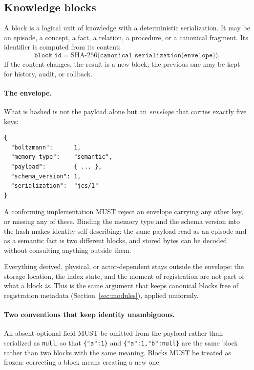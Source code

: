 \documentclass[11pt,a4paper]{article}
\begin{document}
\subsection{Knowledge blocks}
\label{sec:blocks}

A block is a logical unit of knowledge with a deterministic serialization. It
may be an episode, a concept, a fact, a relation, a procedure, or a canonical
fragment. Its identifier is computed from its content:
\begin{equation}
  \texttt{block\_id} = \mathrm{SHA\text{-}256}\bigl(\texttt{canonical\_serialization(envelope)}\bigr).
\end{equation}
If the content changes, the result is a new block; the previous one may be
kept for history, audit, or rollback.

\paragraph{The envelope.}
What is hashed is not the payload alone but an \emph{envelope} that carries
exactly five keys:
\begin{verbatim}
{
  "boltzmann":      1,
  "memory_type":    "semantic",
  "payload":        { ... },
  "schema_version": 1,
  "serialization":  "jcs/1"
}
\end{verbatim}
A conforming implementation MUST reject an envelope carrying any other key, or
missing any of these. Binding the memory type and the schema version into the hash makes identity
self-describing: the same payload read as an episode and as a semantic fact is
two different blocks, and stored bytes can be decoded without consulting
anything outside them.

Everything derived, physical, or actor-dependent stays outside the envelope: the
storage location, the index state, and the moment of registration are not part of
what a block \emph{is}. This is the same argument that keeps canonical blocks
free of registration metadata (Section~\ref{sec:modules}), applied uniformly.

\paragraph{Two conventions that keep identity unambiguous.}
An absent optional field MUST be omitted from the payload rather than serialized
as \texttt{null}, so that \texttt{\{"a":1\}} and \texttt{\{"a":1,"b":null\}} are
the same block rather than two blocks with the same meaning. Blocks MUST be
treated as frozen: correcting a block means creating a new one.
\end{document}
